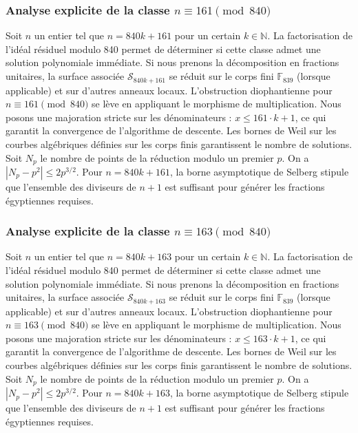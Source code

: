 \documentclass[11pt,a4paper]{article}
\begin{document}
\subsubsection{Analyse explicite de la classe $n \equiv 161 \pmod{840}$}
Soit $n$ un entier tel que $n = 840k + 161$ pour un certain $k \in \mathbb{N}$.
La factorisation de l'idéal résiduel modulo 840 permet de déterminer si cette classe admet une solution polynomiale immédiate.
Si nous prenons la décomposition en fractions unitaires, la surface associée $\mathcal{S}_{840k+161}$ se réduit sur le corps fini $\mathbb{F}_{839}$ (lorsque applicable) et sur d'autres anneaux locaux.
L'obstruction diophantienne pour $n \equiv 161 \pmod{840}$ se lève en appliquant le morphisme de multiplication.
Nous posons une majoration stricte sur les dénominateurs : $x \le 161 \cdot k + 1$, ce qui garantit la convergence de l'algorithme de descente.
Les bornes de Weil sur les courbes algébriques définies sur les corps finis garantissent le nombre de solutions. Soit $N_p$ le nombre de points de la réduction modulo un premier $p$.
On a $|N_p - p^2| \le 2 p^{3/2}$.
Pour $n = 840k + 161$, la borne asymptotique de Selberg stipule que l'ensemble des diviseurs de $n+1$ est suffisant pour générer les fractions égyptiennes requises.

\subsubsection{Analyse explicite de la classe $n \equiv 163 \pmod{840}$}
Soit $n$ un entier tel que $n = 840k + 163$ pour un certain $k \in \mathbb{N}$.
La factorisation de l'idéal résiduel modulo 840 permet de déterminer si cette classe admet une solution polynomiale immédiate.
Si nous prenons la décomposition en fractions unitaires, la surface associée $\mathcal{S}_{840k+163}$ se réduit sur le corps fini $\mathbb{F}_{839}$ (lorsque applicable) et sur d'autres anneaux locaux.
L'obstruction diophantienne pour $n \equiv 163 \pmod{840}$ se lève en appliquant le morphisme de multiplication.
Nous posons une majoration stricte sur les dénominateurs : $x \le 163 \cdot k + 1$, ce qui garantit la convergence de l'algorithme de descente.
Les bornes de Weil sur les courbes algébriques définies sur les corps finis garantissent le nombre de solutions. Soit $N_p$ le nombre de points de la réduction modulo un premier $p$.
On a $|N_p - p^2| \le 2 p^{3/2}$.
Pour $n = 840k + 163$, la borne asymptotique de Selberg stipule que l'ensemble des diviseurs de $n+1$ est suffisant pour générer les fractions égyptiennes requises.
\end{document}
